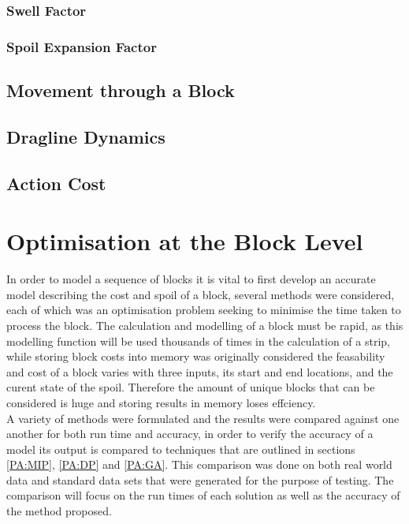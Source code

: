 \subsubsection{Swell Factor}
\subsubsection{Spoil Expansion Factor}
\subsection{Movement through a Block}

	
\subsection{Dragline Dynamics}

\subsection{Action Cost}

\section{Optimisation at the Block Level}
In order to model a sequence of blocks it is vital to first develop an accurate model describing the cost and spoil of a block, several methods were considered, each of which was an optimisation problem seeking to minimise the time taken to process the block. The calculation and modelling of a block must be rapid, as this modelling function will be used thousands of times in the calculation of a strip, while storing block costs into memory was originally considered the feasability and cost of a block varies with three inputs, its start and end locations, and the curent state of the spoil. Therefore the amount of unique blocks that can be considered is huge and storing results in memory loses effciency. \\A variety of methods were formulated and the results were compared against one another for both run time and accuracy, in order to verify the accuracy of a model its output is compared to techniques that are outlined in sections \ref{PA:MIP}, \ref{PA:DP} and \ref{PA:GA}. This comparison was done on both real world data and standard data sets that were generated for the purpose of testing. The comparison will focus on the run times of each solution as well as the accuracy of the method proposed. 


